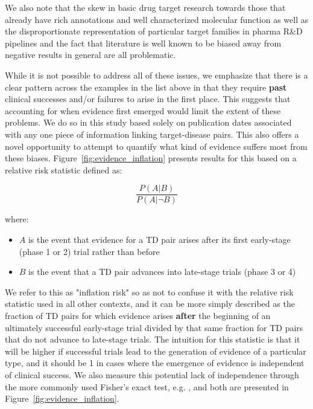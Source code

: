 \documentclass{article}
\begin{document}
We also note that the skew in basic drug target research towards those that already have rich annotations and well characterized molecular function \cite{PMID:29358745} as well as the disproportionate representation of particular target families in pharma R\&D pipelines \cite{PMID:27910877,PPR:PPR7029} and the fact that literature is well known to be biased away from negative results in general \cite{PMID:32893970} are all problematic. 

While it is not possible to address all of these issues, we emphasize that there is a clear pattern across the examples in the list above in that they require \textbf{past} clinical successes and/or failures to arise in the first place. This suggests that accounting for when evidence first emerged would limit the extent of these problems. We do so in this study based solely on publication dates associated with any one piece of information linking target-disease pairs. This also offers a novel opportunity to attempt to quantify what kind of evidence suffers most from these biases. Figure~\ref{fig:evidence_inflation} presents results for this based on a relative risk statistic defined as:

\begin{equation}
  \frac{P(A | B)}{P(A | \neg B)}
\end{equation}

where:

\begin{itemize}
\item \(A\) is the event that evidence for a TD pair arises after its first early-stage (phase 1 or 2) trial rather than before
\item \(B\) is the event that a TD pair advances into late-stage trials (phase 3 or 4)
\end{itemize}

We refer to this as "inflation risk" so as not to confuse it with the relative risk statistic used in all other contexts, and it can be more simply described as the fraction of TD pairs for which evidence arises \textbf{after} the beginning of an ultimately successful early-stage trial divided by that same fraction for TD pairs that do not advance to late-stage trials. The intuition for this statistic is that it will be higher if successful trials lead to the generation of evidence of a particular type, and it should be 1 in cases where the emergence of evidence is independent of clinical success. We also measure this potential lack of independence through the more commonly used Fisher's exact test, e.g. \cite{PMID:19725948}, and both are presented in Figure~\ref{fig:evidence_inflation}.
\end{document}
